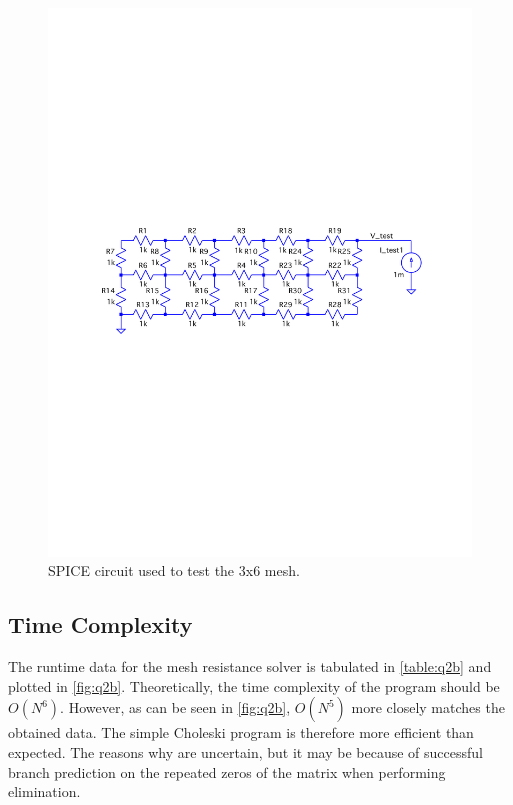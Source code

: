 \documentclass[a4paper,titlepage]{article}
\begin{document}
	\begin{figure}[!htb]
		\centering
		\includegraphics[width=\columnwidth]{plots/q2a_mesh_3.pdf}
		\caption
		{SPICE circuit used to test the 3x6 mesh.}
		\label{fig:q2a_mesh_3}
	\end{figure}
	
	\subsection{Time Complexity}
	
	The runtime data for the mesh resistance solver is tabulated in \autoref{table:q2b} and plotted in \autoref{fig:q2b}. Theoretically, the time complexity of the program should be $O(N^6)$. However, as can be seen in \autoref{fig:q2b}, $O(N^5)$ more closely matches the obtained data. The simple Choleski program is therefore more efficient than expected. The reasons why are uncertain, but it may be because of successful branch prediction on the repeated zeros of the matrix when performing elimination.
	
\end{document}
